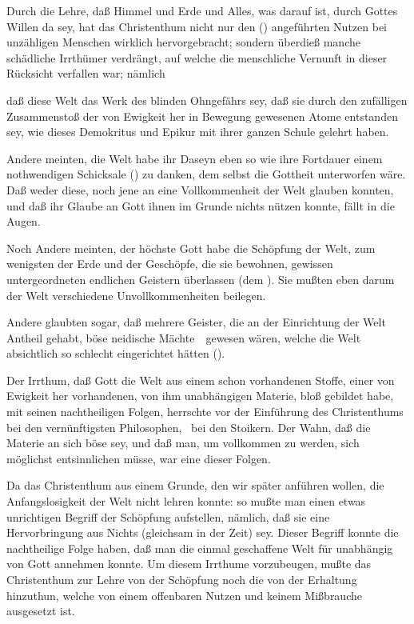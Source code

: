 \begin{aufza}
\item Durch die Lehre, daß Himmel und Erde und Alles, was darauf ist, durch Gottes Willen da sey, hat das Christenthum nicht nur den () angeführten Nutzen bei unzähligen Menschen wirklich hervorgebracht; sondern überdieß manche schädliche Irrthümer verdrängt, auf welche die menschliche Vernunft in dieser Rücksicht verfallen war; nämlich
\begin{aufzb}
\item daß diese Welt das Werk des blinden Ohngefährs sey, daß sie durch den zufälligen Zusammenstoß der von Ewigkeit her in Bewegung gewesenen Atome entstanden sey, wie dieses Demokritus und Epikur mit ihrer ganzen Schule gelehrt haben.
\item Andere meinten, die Welt habe ihr Daseyn eben so wie ihre Fortdauer einem nothwendigen Schicksale () zu danken, dem selbst die Gottheit unterworfen wäre. Daß weder diese, noch jene an eine Vollkommenheit der Welt glauben konnten, und daß ihr Glaube an Gott ihnen im Grunde nichts nützen konnte, fällt in die Augen.
\item Noch Andere meinten, der höchste Gott habe die Schöpfung der Welt, zum wenigsten der Erde und der Geschöpfe, die sie bewohnen, gewissen untergeordneten endlichen Geistern überlassen (dem ). Sie mußten eben darum der Welt verschiedene Unvollkommenheiten beilegen.
\item Andere glaubten sogar, daß mehrere Geister, die an der Einrichtung der Welt Antheil gehabt, böse neidische Mächte~\ gewesen wären, welche die Welt absichtlich so schlecht eingerichtet hätten ().
\end{aufzb}
\item Der Irrthum, daß Gott die Welt aus einem schon vorhandenen Stoffe, einer von Ewigkeit her vorhandenen, von ihm unabhängigen Materie, bloß gebildet habe, mit seinen nachtheiligen Folgen, herrschte vor der Einführung des Christenthums bei den vernünftigsten Philosophen, \zB\ bei den Stoikern. Der Wahn, daß die Materie an sich böse sey, und daß man, um vollkommen zu werden, sich möglichst entsinnlichen müsse, war eine dieser Folgen.
\item Da das Christenthum aus einem Grunde, den wir später anführen wollen, die Anfangslosigkeit der Welt nicht lehren konnte: so mußte man einen etwas unrichtigen Begriff der Schöpfung aufstellen, nämlich, daß sie eine Hervorbringung aus Nichts (gleichsam in der Zeit) sey. Dieser Begriff konnte die nachtheilige Folge haben, daß man die einmal geschaffene Welt für unabhängig von Gott annehmen konnte. Um diesem Irrthume vorzubeugen, mußte das Christenthum zur Lehre von der Schöpfung noch die von der Erhaltung hinzuthun, welche von einem offenbaren Nutzen und keinem Mißbrauche ausgesetzt ist.

\end{aufza}

